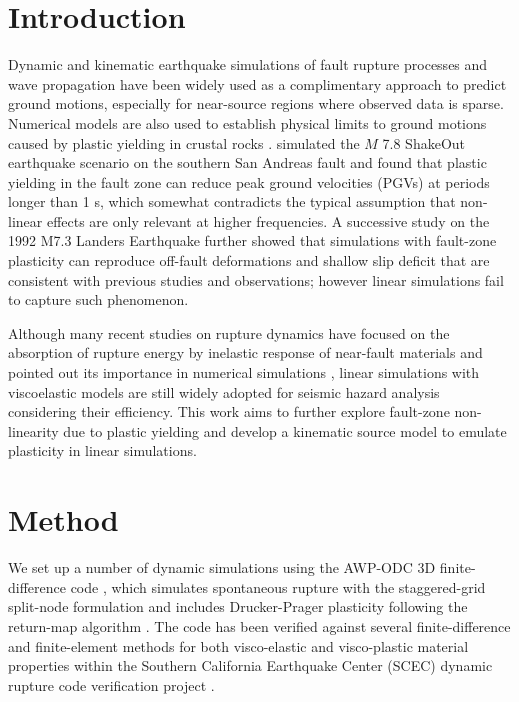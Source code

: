 \section{Introduction} \label{eks:intro}
Dynamic and kinematic earthquake simulations of fault rupture processes and wave propagation have been widely used as a complimentary approach to predict ground motions, especially for near-source regions where observed data is sparse. Numerical models are also used to establish physical limits to ground motions caused by plastic yielding in crustal rocks . \citet{rotenExpectedSeismicShaking2014} simulated the $M$ 7.8 ShakeOut earthquake scenario on the southern San Andreas fault and found that plastic yielding in the fault zone can reduce peak ground velocities (PGVs) at periods longer than 1 s, which somewhat contradicts the typical assumption that non-linear effects are only relevant at higher frequencies. A successive study \citep{rotenOfffaultDeformationsShallow2017} on the 1992 M7.3 Landers Earthquake further showed that simulations with fault-zone plasticity can reproduce off-fault deformations and shallow slip deficit that are consistent with previous studies and observations; however linear simulations fail to capture such phenomenon.

Although many recent studies on rupture dynamics have focused on the absorption of rupture energy by inelastic response of near-fault materials and pointed out its importance in numerical simulations , linear simulations with viscoelastic models are still widely adopted for seismic hazard analysis considering their efficiency. This work aims to further explore fault-zone non-linearity due to plastic yielding and develop a kinematic source model to emulate plasticity in linear simulations.



\section{Method}\label{eks:method}
We set up a number of dynamic simulations using the AWP-ODC 3D finite-difference code \citep{olsenThreeDimensionalSimulationMagnitude1995,dayMemoryEfficientSimulationAnelastic2001,cuiScalableEarthquakeSimulation2010}, which simulates spontaneous rupture with the staggered-grid split-node formulation \citep{dalguer2007staggered} and includes Drucker-Prager plasticity following the return-map algorithm \citep{rotenOfffaultDeformationsShallow2017}. The code has been verified against several finite-difference and finite-element methods for both visco-elastic and visco-plastic material properties within the Southern California Earthquake Center (SCEC) dynamic rupture code verification project \citep{harris2009scec,harris2011verifying}.

